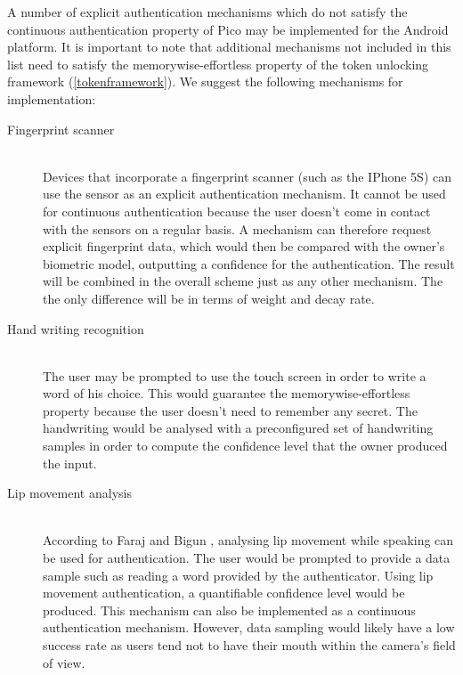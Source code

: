 A number of explicit authentication mechanisms which do not satisfy the continuous authentication property of Pico may be implemented for the Android platform. It is important to note that additional mechanisms not included in this list need to satisfy the memorywise-effortless property of the token unlocking framework (\ref{tokenframework}). We suggest the following mechanisms for implementation:
\begin{description}
  \item[Fingerprint scanner] \hfill \\
  Devices that incorporate a fingerprint scanner (such as the IPhone 5S) can use the sensor as an explicit authentication mechanism. It cannot be used for continuous authentication because the user doesn't come in contact with the sensors on a regular basis. A mechanism can therefore request explicit fingerprint data, which would then be compared with the owner's biometric model, outputting a confidence for the authentication. The result will be combined in the overall scheme just as any other mechanism. The the only difference will be in terms of weight and decay rate.
    
  \item[Hand writing recognition] \hfill \\
  The user may be prompted to use the touch screen in order to write a word of his choice. This would guarantee the memorywise-effortless property because the user doesn't need to remember any secret. The handwriting would be analysed with a preconfigured set of handwriting samples in order to compute the confidence level that the owner produced the input.
  
  \item[Lip movement analysis] \hfill \\
  According to Faraj and Bigun \cite{faraj2006motion}, analysing lip movement while speaking can be used for authentication. The user would be prompted to provide a data sample such as reading a word provided by the authenticator. Using lip movement authentication, a quantifiable confidence level would be produced. This mechanism can also be implemented as a continuous authentication mechanism. However, data sampling would likely have a low success rate as users tend not to have their mouth within the camera's field of view.
\end{description}